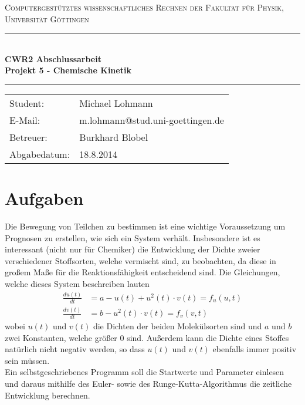 \documentclass[12pt,a4paper,titlepage,headinclude,bibtotoc]{scrartcl}
\begin{document}
\begin{titlepage}
\centering
\textsc{\Large Computergestütztes wissenschaftliches Rechnen der Fakultät für
  Physik,\\[1.5ex] Universität Göttingen}

\vspace*{4.2cm}

\rule{\textwidth}{1pt}\\[0.5cm]
{\huge \bfseries
  CWR2 Abschlussarbeit\\[1.5ex]
  Projekt 5 - Chemische Kinetik}\\[0.5cm]
\rule{\textwidth}{1pt}

\vspace*{3.5cm}

\begin{Large}
\begin{tabular}{ll}
Student: &  Michael Lohmann\\
E-Mail: & m.lohmann@stud.uni-goettingen.de\\
Betreuer: & Burkhard Blobel \\
Abgabedatum: & 18.8.2014\\
\end{tabular}
\end{Large}

\vspace*{0.8cm}

\begin{Large}
\end{Large}

\end{titlepage}

\tableofcontents

\newpage

\section{Aufgaben}
Die Bewegung von Teilchen zu bestimmen ist eine wichtige Voraussetzung um Prognosen zu erstellen, wie sich ein System verhält.
Insbesondere ist es interessant (nicht nur für Chemiker) die Entwicklung der Dichte zweier verschiedener Stoffsorten, welche vermischt sind, zu beobachten, da diese in großem Maße für die Reaktionsfähigkeit entscheidend sind.
Die Gleichungen, welche dieses System beschreiben lauten
\begin{align}
\frac{du(t)}{dt}&=a-u(t)+u^2(t)\cdot v(t)=f_u(u,t)\\
\frac{dv(t)}{dt}&=b-u^2(t)\cdot v(t)=f_v(v,t)
\end{align}
wobei $u(t)$ und $v(t)$ die Dichten der beiden Molekülsorten sind und $a$ und $b$ zwei Konstanten, welche größer 0 sind. Außerdem kann die Dichte eines Stoffes natürlich nicht negativ werden, so dass $u(t)$ und $v(t)$ ebenfalls immer positiv sein müssen.\\
Ein selbstgeschriebenes Programm soll die Startwerte und Parameter einlesen und daraus mithilfe des Euler- sowie des Runge-Kutta-Algorithmus die zeitliche Entwicklung berechnen.
\end{document}
